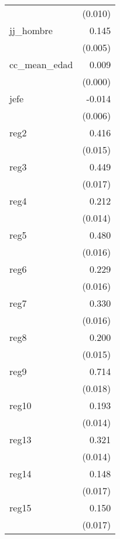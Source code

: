 {\begin{longtable}{l*{1}{D{.}{.}{-1}}}
            &     (0.010)         \\
\addlinespace
jj\_hombre   &       0.145\sym{***}\\
            &     (0.005)         \\
\addlinespace
cc\_mean\_edad&       0.009\sym{***}\\
            &     (0.000)         \\
\addlinespace
jefe        &      -0.014\sym{*}  \\
            &     (0.006)         \\
\addlinespace
reg2        &       0.416\sym{***}\\
            &     (0.015)         \\
\addlinespace
reg3        &       0.449\sym{***}\\
            &     (0.017)         \\
\addlinespace
reg4        &       0.212\sym{***}\\
            &     (0.014)         \\
\addlinespace
reg5        &       0.480\sym{***}\\
            &     (0.016)         \\
\addlinespace
reg6        &       0.229\sym{***}\\
            &     (0.016)         \\
\addlinespace
reg7        &       0.330\sym{***}\\
            &     (0.016)         \\
\addlinespace
reg8        &       0.200\sym{***}\\
            &     (0.015)         \\
\addlinespace
reg9        &       0.714\sym{***}\\
            &     (0.018)         \\
\addlinespace
reg10       &       0.193\sym{***}\\
            &     (0.014)         \\
\addlinespace
reg13       &       0.321\sym{***}\\
            &     (0.014)         \\
\addlinespace
reg14       &       0.148\sym{***}\\
            &     (0.017)         \\
\addlinespace
reg15       &       0.150\sym{***}\\
            &     (0.017)         \\

\end{longtable}}
